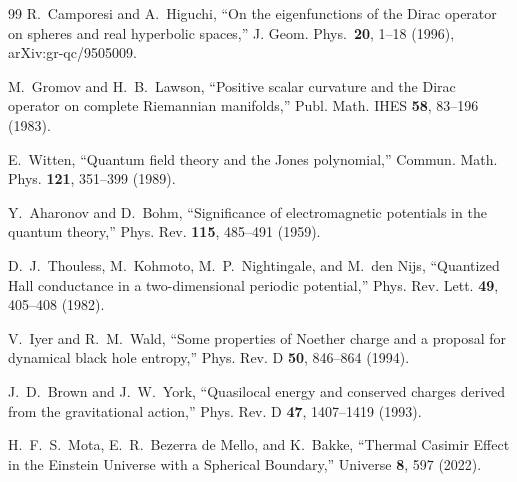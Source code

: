 \documentclass[aps,prd,onecolumn,superscriptaddress,longbibliography,nofootinbib,notitlepage]{revtex4-2}
\begin{document}
\begin{thebibliography}{99}
R.~Camporesi and A.~Higuchi,
``On the eigenfunctions of the Dirac operator on spheres and real hyperbolic spaces,''
J. Geom. Phys.\ \textbf{20}, 1--18 (1996), arXiv:gr-qc/9505009.

M.~Gromov and H.~B.~Lawson,
``Positive scalar curvature and the Dirac operator on complete Riemannian manifolds,''
Publ. Math. IHES \textbf{58}, 83--196 (1983).


E.~Witten,
``Quantum field theory and the Jones polynomial,''
Commun. Math. Phys. \textbf{121}, 351--399 (1989).

Y.~Aharonov and D.~Bohm,
``Significance of electromagnetic potentials in the quantum theory,''
Phys. Rev. \textbf{115}, 485--491 (1959).

D.~J.~Thouless, M.~Kohmoto, M.~P.~Nightingale, and M.~den Nijs,
``Quantized Hall conductance in a two-dimensional periodic potential,''
Phys. Rev. Lett. \textbf{49}, 405--408 (1982).

V.~Iyer and R.~M.~Wald,
``Some properties of Noether charge and a proposal for dynamical black hole entropy,''
Phys. Rev. D \textbf{50}, 846--864 (1994).

J.~D.~Brown and J.~W.~York,
``Quasilocal energy and conserved charges derived from the gravitational action,''
Phys. Rev. D \textbf{47}, 1407--1419 (1993).

H.~F.~S.~Mota, E.~R.~Bezerra de Mello, and K.~Bakke,
``Thermal Casimir Effect in the Einstein Universe with a Spherical Boundary,''
Universe \textbf{8}, 597 (2022).





\end{thebibliography}
\end{document}
